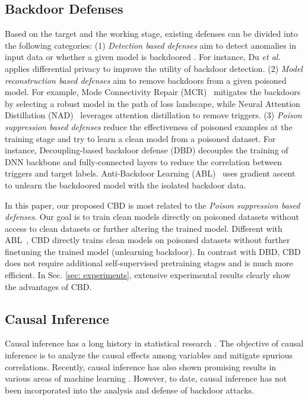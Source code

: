 \subsection{Backdoor Defenses}
Based on the target and the working stage, existing defenses can be divided into the following categories: (1) \emph{Detection based defenses} aim to detect anomalies in input data \cite{chen2018detecting,tran2018spectral,gao2019strip,xu2019detecting,hayase2021spectre,tang2021demon, Februus20} or whether a given model is backdoored \cite{wang2019neural,chen2019deepinspect,kolouri2020universal,shen2021backdoor}. For instance, Du \emph{et al.}~\cite{DPdetection} applies differential privacy to improve the utility of backdoor detection.
(2) \emph{Model reconstruction based defenses} aim to remove backdoors from a given poisoned model. For example, Mode Connectivity Repair (MCR)~\cite{zhao2020bridging} mitigates the backdoors by selecting a robust model in the path of loss landscape, while Neural Attention Distillation (NAD)~\cite{li2021neural} leverages attention distillation to remove triggers. (3) \emph{Poison suppression based defenses} \cite{li2021anti,backdoordecouple} reduce the effectiveness of poisoned examples at the training stage and try to learn a clean model from a poisoned dataset. For instance, Decoupling-based backdoor defense (DBD) \cite{backdoordecouple} decouples the training of DNN backbone and fully-connected layers to reduce the correlation between triggers and target labels. 
Anti-Backdoor Learning (ABL)~\cite{li2021anti} uses gradient ascent to unlearn the backdoored model with the isolated backdoor data. 

In this paper, our proposed CBD is most related to the \emph{Poison suppression based defenses}. Our goal is to train clean models directly on poisoned datasets without access to clean datasets or further altering the trained model. 
Different with ABL~\cite{li2021anti}, CBD directly trains clean models on poisoned datasets without further finetuning the trained model (unlearning backdoor). In contrast with DBD, CBD does not require additional self-supervised pretraining stages and is much more efficient. In Sec. \ref{sec: experiments}, extensive experimental results clearly show the advantages of CBD. 

\subsection{Causal Inference}
Causal inference has a long history in statistical research \cite{causality,bookwhy, causalinference}. The objective of causal inference is to analyze the causal effects among variables and mitigate spurious correlations. Recently, causal inference has also shown promising results in various areas of machine learning \cite{niu2021counterfactual,mitrovic2020representation, yue2020interventional,tang2020long,zhang2020causal,zhang2022adversarial, huang2022deconfounded}. 
However, to date, causal inference has not been incorporated into the analysis and defense of backdoor attacks.

